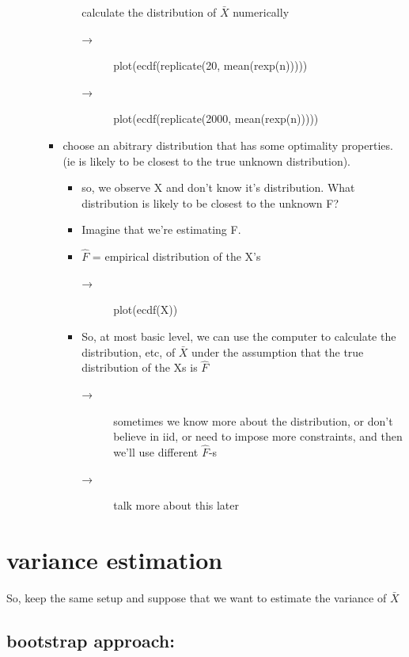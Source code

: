 \documentclass[11pt]{article}
\begin{document}
\begin{itemize}
\begin{itemize}
\begin{itemize}
\begin{itemize}
           calculate the distribution of $\bar X$ numerically
\begin{description}
\item[→] plot(ecdf(replicate(20, mean(rexp(n)))))
\item[→] plot(ecdf(replicate(2000, mean(rexp(n)))))
\end{description}
\end{itemize}
\item choose an abitrary distribution that has some optimality
         properties. (ie is likely to be closest to the true unknown
         distribution).
\begin{itemize}
\item so, we observe X and don't know it's distribution.  What
           distribution is likely to be closest to the unknown F?
\item Imagine that we're estimating F.
\item $\hat F$ = empirical distribution of the X's
\begin{description}
\item[→] plot(ecdf(X))
\end{description}
\item So, at most basic level, we can use the computer to
           calculate the distribution, etc, of $\bar X$ under the
           assumption that the true distribution of the Xs is $\hat F$
\begin{description}
\item[→] sometimes we know more about the distribution, or don't
             believe in iid, or need to impose more constraints, and
             then we'll use different $\hat F$-s
\item[→] talk more about this later
\end{description}
\end{itemize}
\end{itemize}
\end{itemize}
\end{itemize}
\section{variance estimation}
\label{sec-1}

    So, keep the same setup and suppose that we want to estimate the
    variance of $\bar X$
\subsection{bootstrap approach:}
\label{sec-1-1}
\end{document}

